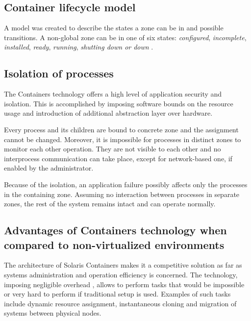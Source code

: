 \documentclass[11pt]{book}
\begin{document}
      \subsection{Container lifecycle model}
      \label{sub:}

        A model was created to describe the states a zone can be in and possible transitions. A non-global zone can be in one of six states:
        \textit{configured}, \textit{incomplete}, \textit{installed}, \textit{ready}, \textit{running}, \textit{shutting
        down or down} \cite{sag}.



      \subsection{Isolation of processes}
      \label{sub:}

        The Containers technology offers a high level of application security and isolation. This is accomplished by
        imposing software bounds on the resource usage and introduction of additional abstraction layer over hardware.

        Every process and its children are bound to concrete zone and the assignment cannot be changed. Moreover, it is
        impossible for processes in distinct zones to monitor each other operation. They are not visible to each other
        and no interprocess communication can take place, except for network-based one, if enabled by the administrator.

        Because of the isolation, an application failure possibly affects only the processes in the containing zone.
        Assuming no interaction between processes in separate zones, the rest of the system remains intact and can
        operate normally.
        
      

      \subsection{Advantages of Containers technology when compared to non-virtualized environments}
      \label{sub:}

        The architecture of Solaris Containers makes it a competitive solution as far as systems administration and
        operation efficiency is concerned. The technology, imposing negligible overhead \cite{price}, allows to perform tasks that would be
        impossible or very hard to perform if traditional setup is used. Examples of such tasks include dynamic resource
        assignment, instantaneous cloning and migration of systems between physical nodes.
\end{document}
